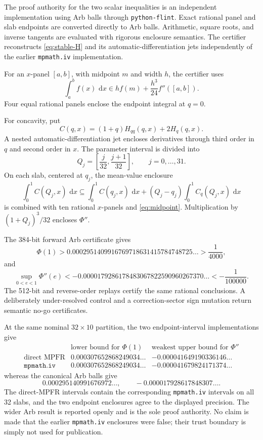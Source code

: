 \documentclass[11pt]{article}
\numberwithin{equation}{section}
\theoremstyle{remark}
\newcommand{\dd}{\,\mathrm d}
\begin{document}
The proof authority for the two scalar inequalities is an independent implementation using Arb balls through \texttt{python-flint}.  Exact rational panel and slab endpoints are converted directly to Arb balls.  Arithmetic, square roots, and inverse tangents are evaluated with rigorous enclosure semantics.  The certifier reconstructs \eqref{eq:stable-H} and its automatic-differentiation jets independently of the earlier \texttt{mpmath.iv} implementation.

For an \(x\)-panel \([a,b]\), with midpoint \(m\) and width \(h\), the certifier uses
\begin{equation}
  \int_a^bf(x)\,\dd x
  \in h f(m)+\frac{h^3}{24}f''([a,b]).
  \label{eq:midpoint}
\end{equation}
Four equal rational panels enclose the endpoint integral at \(q=0\).

For concavity, put
\[
  C(q,x)=(1+q)H_{qq}(q,x)+2H_q(q,x).
\]
A nested automatic-differentiation jet encloses derivatives through third order in \(q\) and second order in \(x\).  The parameter interval is divided into
\[
  Q_j=\left[\frac j{32},\frac{j+1}{32}\right],
  \qquad j=0,\ldots,31.
\]
On each slab, centered at \(q_j\), the mean-value enclosure
\[
  \int_0^1C(Q_j,x)\,\dd x
  \subseteq
  \int_0^1C(q_j,x)\,\dd x
  +(Q_j-q_j)\int_0^1C_q(Q_j,x)\,\dd x
\]
is combined with ten rational \(x\)-panels and \eqref{eq:midpoint}.  Multiplication by \((1+Q_j)^3/32\) encloses \(\Phi''\).

The 384-bit forward Arb certificate gives
\[
  \Phi(1)>
  0.0002951409916769718631415784748725\ldots
  >\frac1{4000},
\]
and
\[
  \sup_{0<e<1}\Phi''(e)
  <-0.0000179286178483067822590960267370\ldots
  <-\frac1{100000}.
\]
The 512-bit and reverse-order replays certify the same rational conclusions.  A deliberately under-resolved control and a correction-sector sign mutation return semantic no-go certificates.

At the same nominal $32\times10$ partition, the two endpoint-interval implementations give
\[
\begin{array}{c|cc}
 & \text{lower bound for }\Phi(1) & \text{weakest upper bound for }\Phi'' \\
\hline
\text{direct MPFR} & 0.000307652868249034\ldots & -0.000041649190336146\ldots \\
\texttt{mpmath.iv} & 0.000307652868249034\ldots & -0.000041679824171374\ldots
\end{array}
\]
whereas the canonical Arb balls give
\[
  0.000295140991676972\ldots,
  \qquad
  -0.000017928617848307\ldots .
\]
The direct-MPFR intervals contain the corresponding \texttt{mpmath.iv} intervals on all 32 slabs, and the two endpoint enclosures agree to the displayed precision.  The wider Arb result is reported openly and is the sole proof authority.  No claim is made that the earlier \texttt{mpmath.iv} enclosures were false; their trust boundary is simply not used for publication.
\end{document}
